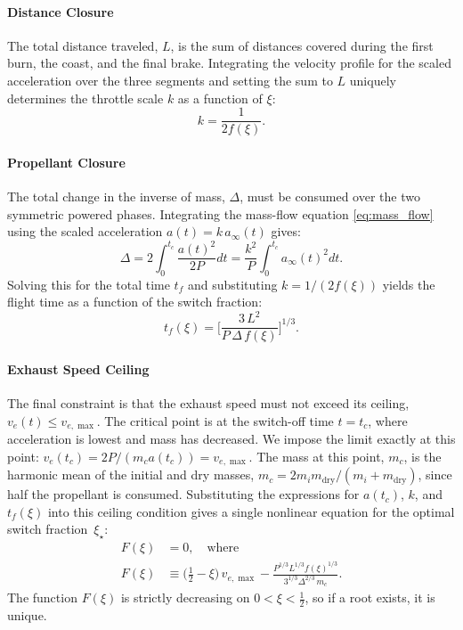 \documentclass[journal, a4paper]{IEEEtran}
\begin{document}
\paragraph{Distance Closure}
The total distance traveled, $L$, is the sum of distances covered during the first burn, the coast, and the final brake. Integrating the velocity profile for the scaled acceleration over the three segments and setting the sum to $L$ uniquely determines the throttle scale $k$ as a function of $\xi$:
\begin{equation}
k = \frac{1}{2f(\xi)}.
\end{equation}

\paragraph{Propellant Closure}
The total change in the inverse of mass, $\Delta$, must be consumed over the two symmetric powered phases. Integrating the mass-flow equation \eqref{eq:mass_flow} using the scaled acceleration $a(t) = k\, a_\infty(t)$ gives:
\begin{equation}
\Delta = 2 \int_0^{t_c} \frac{a(t)^2}{2P} dt = \frac{k^2}{P} \int_0^{t_c} a_\infty(t)^2 dt.
\end{equation}
Solving this for the total time $t_f$ and substituting $k=1/(2f(\xi))$ yields the flight time as a function of the switch fraction:
\begin{equation}
t_f(\xi)=
\Biggl[
\frac{3\,L^{2}}{P\,\Delta\,f(\xi)}
\Biggr]^{\!\!1/3}.
\label{eq:T_of_xi_new}
\end{equation}

\paragraph{Exhaust Speed Ceiling}
The final constraint is that the exhaust speed must not exceed its ceiling, $v_e(t) \le v_{e,\max}$. The critical point is at the switch-off time $t=t_c$, where acceleration is lowest and mass has decreased. We impose the limit exactly at this point: $v_e(t_c) = 2P/(m_c a(t_c)) = v_{e,\max}$. The mass at this point, $m_c$, is the harmonic mean of the initial and dry masses, $m_c=2m_i m_\mathrm{dry}/(m_i+m_\mathrm{dry})$, since half the propellant is consumed. Substituting the expressions for $a(t_c)$, $k$, and $t_f(\xi)$ into this ceiling condition gives a single nonlinear equation for the optimal switch fraction~$\xi_\star$:
\begin{align}
F(\xi)&=0, \quad \text{where} \\
F(\xi)&\equiv
\bigl(\tfrac12-\xi\bigr)\,v_{e,\max}
-\frac{P^{1/3}L^{1/3}f(\xi)^{1/3}}
     {3^{1/3}\Delta^{2/3}\,m_c}.
\label{eq:root_equation_new}
\end{align}
The function $F(\xi)$ is strictly decreasing on $0<\xi<\tfrac12$, so if a root exists, it is unique.
\end{document}
